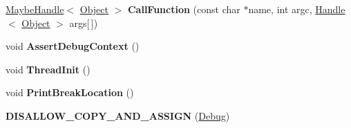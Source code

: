 \begin{DoxyCompactItemize}
\item 
\hyperlink{classv8_1_1internal_1_1_maybe_handle}{Maybe\+Handle}$<$ \hyperlink{classv8_1_1internal_1_1_object}{Object} $>$ {\bfseries Call\+Function} (const char $\ast$name, int argc, \hyperlink{classv8_1_1internal_1_1_handle}{Handle}$<$ \hyperlink{classv8_1_1internal_1_1_object}{Object} $>$ args\mbox{[}$\,$\mbox{]})\hypertarget{classv8_1_1internal_1_1_debug_a6feb8ebc192965c667a1bd7d210f6cbb}{}\label{classv8_1_1internal_1_1_debug_a6feb8ebc192965c667a1bd7d210f6cbb}

\item 
void {\bfseries Assert\+Debug\+Context} ()\hypertarget{classv8_1_1internal_1_1_debug_a2036a99f593e1d3b07b3861841850c19}{}\label{classv8_1_1internal_1_1_debug_a2036a99f593e1d3b07b3861841850c19}

\item 
void {\bfseries Thread\+Init} ()\hypertarget{classv8_1_1internal_1_1_debug_abe9736866d141e787f381e0ce1350c4a}{}\label{classv8_1_1internal_1_1_debug_abe9736866d141e787f381e0ce1350c4a}

\item 
void {\bfseries Print\+Break\+Location} ()\hypertarget{classv8_1_1internal_1_1_debug_ae2317d4530e1d61b99fbdd5ae9cc2834}{}\label{classv8_1_1internal_1_1_debug_ae2317d4530e1d61b99fbdd5ae9cc2834}

\item 
{\bfseries D\+I\+S\+A\+L\+L\+O\+W\+\_\+\+C\+O\+P\+Y\+\_\+\+A\+N\+D\+\_\+\+A\+S\+S\+I\+GN} (\hyperlink{classv8_1_1internal_1_1_debug}{Debug})\hypertarget{classv8_1_1internal_1_1_debug_ad19514c1b440edf7f463931f43d4cb71}{}\label{classv8_1_1internal_1_1_debug_ad19514c1b440edf7f463931f43d4cb71}

\end{DoxyCompactItemize}
